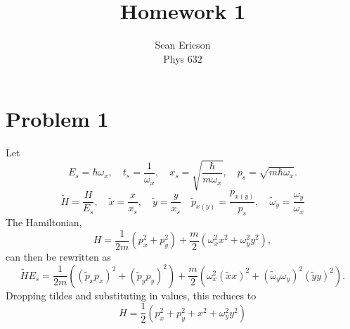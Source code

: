 \documentclass[12pt]{article}
\begin{document}
	
\title{Homework 1}
\author{Sean Ericson \\ Phys 632}
\maketitle

\section*{Problem 1}
Let 
\[ E_s = \hbar\omega_x, \quad t_s = \frac{1}{\omega_x}, \quad x_s = \sqrt{\frac{\hbar}{m\omega_x}}, \quad p_s = \sqrt{m\hbar\omega_x}. \]
\[ \tilde{H} = \frac{H}{E_s}, \quad \tilde{x} = \frac{x}{x_s}, \quad \tilde{y} = \frac{y}{x_s} \quad \tilde{p}_{x(y)} = \frac{p_{x(y)}}{p_s}, \quad \tilde{\omega}_y = \frac{\omega_y}{\omega_x} \]
The Hamiltonian,
\[ H = \frac{1}{2m}\left(p_x^2 + p_y^2\right) + \frac{m}{2}\left(\omega_x^2x^2 + \omega_y^2y^2\right), \]
can then be rewritten as
\[ \tilde{H}E_s = \frac{1}{2m}\left((\tilde{p}_xp_x)^2 + (\tilde{p}_yp_y)^2\right) + \frac{m}{2}\left(\omega_x^2(\tilde{x}x)^2 + (\tilde{\omega}_y\omega_y)^2(\tilde{y}y)^2\right). \] 
Dropping tildes and substituting in values, this reduces to
\[ H = \frac{1}{2}\left(p_x^2 + p_y^2 + x^2 + \omega_y^2y^2\right) \]
\end{document}
